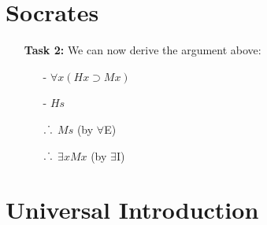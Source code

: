 \documentclass[a4paper, 11pt]{article} %
\def\therefore{\ensuremath{\ldotp\dot\,\ldotp}}
\begin{document}
\section*{Socrates}

\begin{enumerate}
  \item[\bf Task 2:] We can now derive the argument above:
    \begin{itemize}
      \item[-] $\forall x(Hx \supset Mx)$
      \item[-] $Hs$
      \item[$\therefore$] $Ms$ \quad (by $\forall$E) 
      \item[$\therefore$] $\exists xMx$ \quad (by $\exists$I)   
    \end{itemize}
\end{enumerate}






\section*{Universal Introduction}
\end{document}
